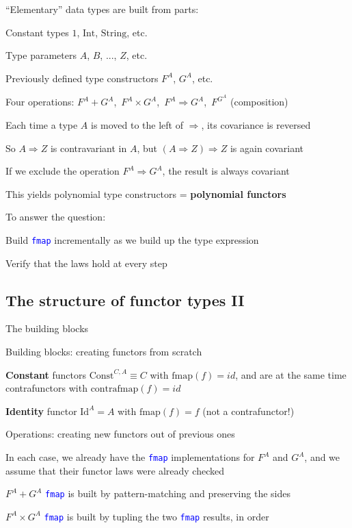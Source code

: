 ``Elementary'' data types are built from parts:

Constant types $1$, $\text{Int}$, $\text{String}$, etc.

Type parameters $A$, $B$, ..., $Z$, etc.

Previously defined type constructors $F^{A}$, $G^{A}$, etc.

Four operations: $F^{A}+G^{A}$,\  $F^{A}\times G^{A}$,\  $F^{A}\Rightarrow G^{A}$,\ 
$F^{G^{A}}$ (composition)

Each time a type $A$ is moved to the left of $\Rightarrow$, its
covariance is reversed

So $A\Rightarrow Z$ is contravariant in $A$, but $\left(A\Rightarrow Z\right)\Rightarrow Z$
is again covariant

If we exclude the operation $F^{A}\Rightarrow G^{A}$, the result
is always covariant

This yields polynomial type constructors = \textbf{polynomial functors}

To answer the question:

Build \texttt{\textcolor{blue}{\footnotesize{}fmap}} incrementally
as we build up the type expression

Verify that the laws hold at every step


\subsection{The structure of functor types II}

The building blocks

Building blocks: creating functors from scratch

\textbf{Constant} functors $\text{Const}^{C,A}\equiv C$ with $\text{fmap}(f)=id$,
and are at the same time contrafunctors with $\text{contrafmap}(f)=id$

\textbf{Identity} functor $\text{Id}^{A}=A$ with $\text{fmap}(f)=f$
(not a contrafunctor!)

Operations: creating new functors out of previous ones

In each case, we already have the \texttt{\textcolor{blue}{\footnotesize{}fmap}}
implementations for $F^{A}$ and $G^{A}$, and we assume that their
functor laws were already checked 

$F^{A}+G^{A}$ \textendash{} \texttt{\textcolor{blue}{\footnotesize{}fmap}}
is built by pattern-matching and preserving the sides

$F^{A}\times G^{A}$ \textendash{} \texttt{\textcolor{blue}{\footnotesize{}fmap}}
is built by tupling the two \texttt{\textcolor{blue}{\footnotesize{}fmap}}
results, in order

